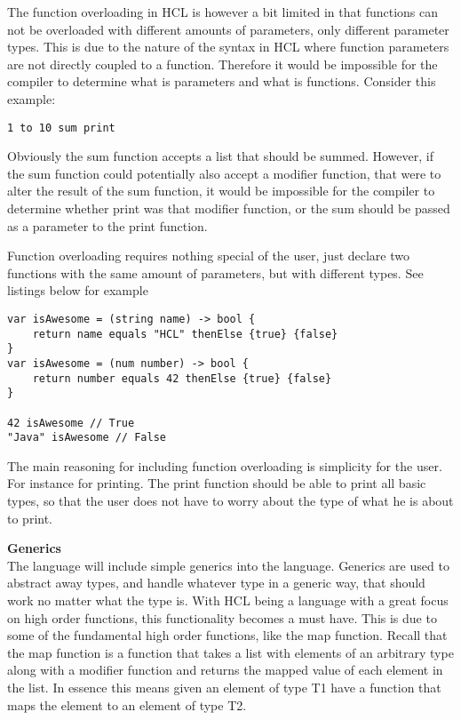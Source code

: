 The function overloading in HCL is however a bit limited in that functions can not be overloaded with different amounts of parameters, only different parameter types. 
This is due to the nature of the syntax in HCL where function parameters are not directly coupled to a function. 
Therefore it would be impossible for the compiler to determine what is parameters and what is functions.
Consider this example:

\begin{lstlisting}
1 to 10 sum print
\end{lstlisting}

Obviously the sum function accepts a list that should be summed. 
However, if the sum function could potentially also accept a modifier function, that were to alter the result of the sum function, it would be impossible for the compiler to determine whether print was that modifier function, or the sum should be passed as a parameter to the print function.

Function overloading requires nothing special of the user, just declare two functions with the same amount of parameters, but with different types. 
See listings below for example

\begin{lstlisting}
var isAwesome = (string name) -> bool {
	return name equals "HCL" thenElse {true} {false}
}
var isAwesome = (num number) -> bool {
	return number equals 42 thenElse {true} {false}
}

42 isAwesome // True
"Java" isAwesome // False
\end{lstlisting}

The main reasoning for including function overloading is simplicity for the user.
For instance for printing. 
The print function should be able to print all basic types, so that the user does not have to worry about the type of what he is about to print.


\textbf{Generics}\\
The language will include simple generics into the language.
Generics are used to abstract away types, and handle whatever type in a generic way, that should work no matter what the type is.
With HCL being a language with a great focus on high order functions, this functionality becomes a must have.
This is due to some of the fundamental high order functions, like the map function.
Recall that the map function is a function that takes a list with elements of an arbitrary type along with a modifier function and returns the mapped value of each element in the list.
In essence this means given an element of type T1 have a function that maps the element to an element of type T2.

